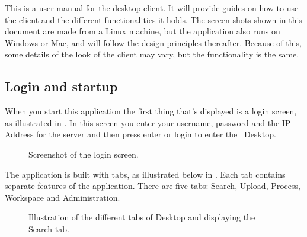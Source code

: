 This is a user manual for the desktop client. It will provide guides on how to 
use the client and the different functionalities it holds. The screen shots 
shown in this document are made from a Linux machine, but the application 
also runs on Windows or Mac, and will follow the design principles thereafter. 
Because of this, some details of the look of the client may vary, but the functionality is the same.

\subsection{Login and startup}
When you start this application the first thing that's displayed is a login screen, as illustrated in . In this screen you enter your username, password and the IP-Address for the server and then press enter or login to enter the \appName\ Desktop.

\begin{figure}[htb]
	\caption{Screenshot of the login screen.}
	\label{fig:des_login-pic}
\end{figure}
The application is built with tabs, as illustrated below in . Each tab contains separate features of the application. There are five tabs: Search, Upload, Process, Workspace and Administration.
\begin{figure}[htb]
	\caption{Illustration of the different tabs of \appName Desktop and displaying the Search tab.}
	\label{fig:des_tabs-view}
\end{figure}
\FloatBarrier

